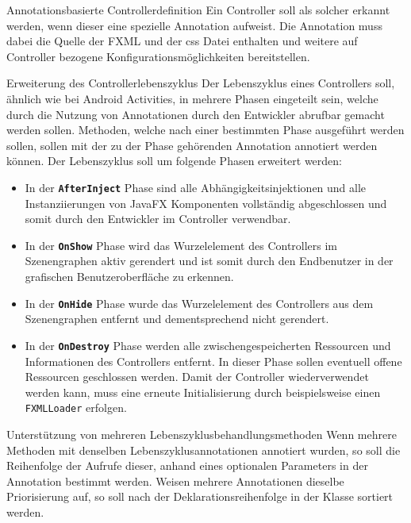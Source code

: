 \begin{freq}{Annotationsbasierte Controllerdefinition}
	Ein Controller soll als solcher erkannt werden, wenn dieser eine spezielle Annotation aufweist. Die Annotation muss dabei die Quelle der FXML und der \ac{css} Datei enthalten und weitere auf Controller bezogene Konfigurationsmöglichkeiten bereitstellen.
\end{freq}
\begin{freq}{Erweiterung des Controllerlebenszyklus}
	Der Lebenszyklus eines Controllers soll, ähnlich wie bei Android Activities, in mehrere Phasen eingeteilt sein, welche durch die Nutzung von Annotationen durch den Entwickler abrufbar gemacht werden sollen. Methoden, welche nach einer bestimmten Phase ausgeführt werden sollen, sollen mit der zu der Phase gehörenden Annotation annotiert werden können. Der Lebenszyklus soll um folgende Phasen erweitert werden:
	\begin{itemize}
		\item In der \textbf{\texttt{AfterInject}} Phase sind alle Abhängigkeitsinjektionen und alle Instanziierungen von JavaFX Komponenten vollständig abgeschlossen und somit durch den Entwickler im Controller verwendbar.
		\item In der \textbf{\texttt{OnShow}} Phase wird das Wurzelelement des Controllers im Szenengraphen aktiv gerendert und ist somit durch den Endbenutzer in der grafischen Benutzeroberfläche zu erkennen.
		\item In der \textbf{\texttt{OnHide}} Phase wurde das Wurzelelement des Controllers aus dem Szenengraphen entfernt und dementsprechend nicht gerendert.
		\item In der \textbf{\texttt{OnDestroy}} Phase werden alle zwischengespeicherten Ressourcen und Informationen des Controllers entfernt. In dieser Phase sollen eventuell offene Ressourcen geschlossen werden. Damit der Controller wiederverwendet werden kann, muss eine erneute Initialisierung durch beispielsweise einen \texttt{FXMLLoader} erfolgen.
	\end{itemize}
\end{freq}
\begin{freq}{Unterstützung von mehreren Lebenszyklusbehandlungsmethoden}
	Wenn mehrere Methoden mit denselben Lebenszyklusannotationen annotiert wurden, so soll die Reihenfolge der Aufrufe dieser, anhand eines optionalen Parameters in der Annotation bestimmt werden. Weisen mehrere Annotationen dieselbe Priorisierung auf, so soll nach der Deklarationsreihenfolge in der Klasse sortiert werden.
\end{freq}
